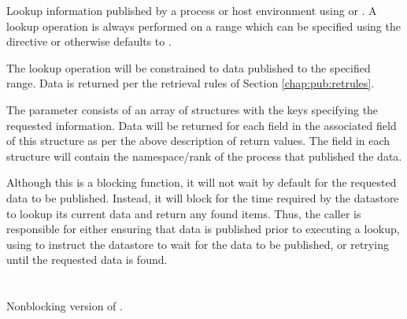 
\optattrend

\descr

Lookup information published by a process or host environment using  or .
A lookup operation is always performed on a range which can be specified using the directive  or otherwise defaults to .

The lookup operation will be constrained to data published to the specified range.
Data is returned per the retrieval rules of Section \ref{chap:pub:retrules}.

The  parameter consists of an array of  structures with the keys specifying the requested information.
Data will be returned for each  field in the associated  field of this structure as per the above description of return values. The  field in each  structure will contain the namespace/rank of the process that published the data.

\adviceuserstart
Although this is a blocking function, it will not wait by default for the requested data to be published.
Instead, it will block for the time required by the datastore to lookup its current data and return any found items.
Thus, the caller is responsible for either ensuring that data is published prior to executing a lookup, using  to instruct the datastore to wait for the data to be published, or retrying until the requested data is found.
\adviceuserend


\section{}

\summary

Nonblocking version of .

\format


